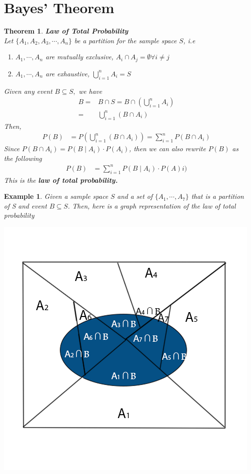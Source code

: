 \documentclass[11pt,oneside]{book}
\theoremstyle{newStyle}
\newtheorem{thm}{Theorem}[chapter]
\newtheorem{ex}{Example}[section]
\begin{document}
\section[Bayes' Theorem ]{Bayes' Theorem}
\begin{thm}
\textbf{Law of Total Probability}\\
Let $\{A_1,A_2,A_3,\cdots,A_n\}$ be a partition for the sample space $S$, i.e \begin{enumerate}[itemsep=0pt, topsep=1pt, partopsep=0pt,label=(\alph*)]
\item $A_1,\cdots,A_n$ are mutually exclusive, $A_i\cap A_j=\emptyset \forall i\neq j$
\item $A_1,\cdots, A_n$ are exhaustive, $\bigcup_{i=1}^{n}A_i=S$
\end{enumerate}
Given any event $B\subseteq S,$ we have \begin{align*}
B=&B\cap S=B\cap \left(\bigcup_{i=1}^{n}A_i \right)\\
=&\bigcup_{i=1}^{n}(B\cap A_i)
\end{align*}
Then, \begin{align*}
P(B)&=P\left( \bigcup_{i=1}^{n}(B\cap A_i)\right)=\sum_{i=1}^{n}P(B\cap A_i)
\end{align*}
Since $P(B\cap A_i)=P(B\mid A_i)\cdot P(A_i)$, then we can also rewrite $P(B)$ as the following \begin{align*}
P(B)&=\sum_{i=1}^{n}P(B\mid A_i)\cdot P(A)i)
\end{align*}
This is the \textbf{law of total probability.}\\
\end{thm}
\begin{ex}
Given a sample space $S$ and a set of $\{A_1,\cdots,A_7\}$ that is a partition of S and event $B\subseteq S$. Then, here is a graph representation of the law of total probability \begin{center}
\includegraphics[scale=2]{graph/bayes_theorem.png}
\end{center}
\end{ex}
\end{document}
